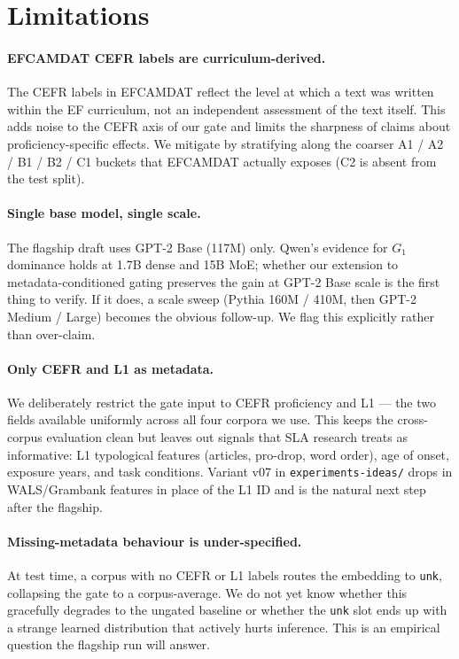 \section*{Limitations}
\label{sec:limitations}

\paragraph{EFCAMDAT CEFR labels are curriculum-derived.}
The CEFR labels in EFCAMDAT reflect the level at which a text was
written within the EF curriculum, not an independent assessment of the
text itself. This adds noise to the CEFR axis of our gate and limits
the sharpness of claims about proficiency-specific effects. We mitigate
by stratifying along the coarser A1 / A2 / B1 / B2 / C1 buckets that
EFCAMDAT actually exposes (C2 is absent from the test split).

\paragraph{Single base model, single scale.}
The flagship draft uses GPT-2 Base (117M) only. Qwen's evidence for
$G_1$ dominance holds at 1.7B dense and 15B MoE; whether our extension
to metadata-conditioned gating preserves the gain at GPT-2 Base scale
is the first thing to verify. If it does, a scale sweep (Pythia 160M /
410M, then GPT-2 Medium / Large) becomes the obvious follow-up. We
flag this explicitly rather than over-claim.

\paragraph{Only CEFR and L1 as metadata.}
We deliberately restrict the gate input to CEFR proficiency and L1 ---
the two fields available uniformly across all four corpora we use. This
keeps the cross-corpus evaluation clean but leaves out signals that SLA
research treats as informative: L1 typological features
(articles, pro-drop, word order), age of onset, exposure years, and
task conditions. Variant v07 in \texttt{experiments-ideas/} drops in
WALS/Grambank features in place of the L1 ID and is the natural next
step after the flagship.

\paragraph{Missing-metadata behaviour is under-specified.}
At test time, a corpus with no CEFR or L1 labels routes the embedding
to \texttt{unk}, collapsing the gate to a corpus-average. We do not
yet know whether this gracefully degrades to the ungated baseline or
whether the \texttt{unk} slot ends up with a strange learned
distribution that actively hurts inference. This is an empirical
question the flagship run will answer.

